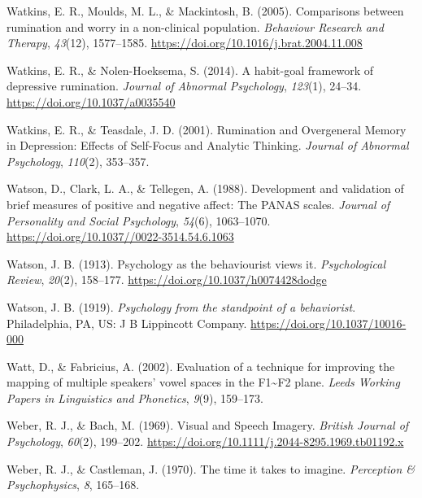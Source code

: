 \documentclass[a4paper,12pt,twoside,openright,oldfontcommands,final]{memoir}
\begin{document}
\leavevmode\hypertarget{ref-watkins_comparisons_2005}{}%
Watkins, E. R., Moulds, M. L., \& Mackintosh, B. (2005). Comparisons between rumination and worry in a non-clinical population. \emph{Behaviour Research and Therapy}, \emph{43}(12), 1577--1585. \url{https://doi.org/10.1016/j.brat.2004.11.008}

\leavevmode\hypertarget{ref-watkins_habit-goal_2014}{}%
Watkins, E. R., \& Nolen-Hoeksema, S. (2014). A habit-goal framework of depressive rumination. \emph{Journal of Abnormal Psychology}, \emph{123}(1), 24--34. \url{https://doi.org/10.1037/a0035540}

\leavevmode\hypertarget{ref-watkins_rumination_2001}{}%
Watkins, E. R., \& Teasdale, J. D. (2001). Rumination and Overgeneral Memory in Depression: Effects of Self-Focus and Analytic Thinking. \emph{Journal of Abnormal Psychology}, \emph{110}(2), 353--357.

\leavevmode\hypertarget{ref-watson_development_1988}{}%
Watson, D., Clark, L. A., \& Tellegen, A. (1988). Development and validation of brief measures of positive and negative affect: The PANAS scales. \emph{Journal of Personality and Social Psychology}, \emph{54}(6), 1063--1070. \url{https://doi.org/10.1037//0022-3514.54.6.1063}

\leavevmode\hypertarget{ref-watson_psychology_1913}{}%
Watson, J. B. (1913). Psychology as the behaviourist views it. \emph{Psychological Review}, \emph{20}(2), 158--177. \url{https://doi.org/10.1037/h0074428dodge}

\leavevmode\hypertarget{ref-watson_psychology_1919}{}%
Watson, J. B. (1919). \emph{Psychology from the standpoint of a behaviorist}. Philadelphia, PA, US: J B Lippincott Company. \url{https://doi.org/10.1037/10016-000}

\leavevmode\hypertarget{ref-watt_evaluation_2002}{}%
Watt, D., \& Fabricius, A. (2002). Evaluation of a technique for improving the mapping of multiple speakers' vowel spaces in the F1\textasciitilde F2 plane. \emph{Leeds Working Papers in Linguistics and Phonetics}, \emph{9}(9), 159--173.

\leavevmode\hypertarget{ref-weber_visual_1969}{}%
Weber, R. J., \& Bach, M. (1969). Visual and Speech Imagery. \emph{British Journal of Psychology}, \emph{60}(2), 199--202. \url{https://doi.org/10.1111/j.2044-8295.1969.tb01192.x}

\leavevmode\hypertarget{ref-weber_time_1970}{}%
Weber, R. J., \& Castleman, J. (1970). The time it takes to imagine. \emph{Perception \& Psychophysics}, \emph{8}, 165--168.
\end{document}
